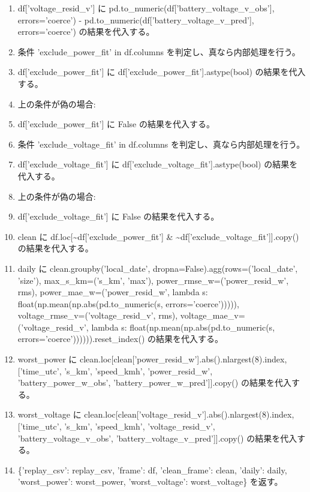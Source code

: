 \documentclass[a4paper,11pt]{article}
\begin{document}
\begin{enumerate}[leftmargin=1.8em]
\item df['voltage\_resid\_v'] に pd.to\_numeric(df['battery\_voltage\_v\_obs'], errors='coerce') - pd.to\_numeric(df['battery\_voltage\_v\_pred'], errors='coerce') の結果を代入する。
\item 条件 'exclude\_power\_fit' in df.columns を判定し、真なら内部処理を行う。
\item   df['exclude\_power\_fit'] に df['exclude\_power\_fit'].astype(bool) の結果を代入する。
\item   上の条件が偽の場合:
\item   df['exclude\_power\_fit'] に False の結果を代入する。
\item 条件 'exclude\_voltage\_fit' in df.columns を判定し、真なら内部処理を行う。
\item   df['exclude\_voltage\_fit'] に df['exclude\_voltage\_fit'].astype(bool) の結果を代入する。
\item   上の条件が偽の場合:
\item   df['exclude\_voltage\_fit'] に False の結果を代入する。
\item clean に df.loc[\textasciitilde{}df['exclude\_power\_fit'] \& \textasciitilde{}df['exclude\_voltage\_fit']].copy() の結果を代入する。
\item daily に clean.groupby('local\_date', dropna=False).agg(rows=('local\_date', 'size'), max\_s\_km=('s\_km', 'max'), power\_rmse\_w=('power\_resid\_w', rms), power\_mae\_w=('power\_resid\_w', lambda s: float(np.mean(np.abs(pd.to\_numeric(s, errors='coerce'))))), voltage\_rmse\_v=('voltage\_resid\_v', rms), voltage\_mae\_v=('voltage\_resid\_v', lambda s: float(np.mean(np.abs(pd.to\_numeric(s, errors='coerce')))))).reset\_index() の結果を代入する。
\item worst\_power に clean.loc[clean['power\_resid\_w'].abs().nlargest(8).index, ['time\_utc', 's\_km', 'speed\_kmh', 'power\_resid\_w', 'battery\_power\_w\_obs', 'battery\_power\_w\_pred']].copy() の結果を代入する。
\item worst\_voltage に clean.loc[clean['voltage\_resid\_v'].abs().nlargest(8).index, ['time\_utc', 's\_km', 'speed\_kmh', 'voltage\_resid\_v', 'battery\_voltage\_v\_obs', 'battery\_voltage\_v\_pred']].copy() の結果を代入する。
\item \{'replay\_csv': replay\_csv, 'frame': df, 'clean\_frame': clean, 'daily': daily, 'worst\_power': worst\_power, 'worst\_voltage': worst\_voltage\} を返す。
            \end{enumerate}
\end{document}
